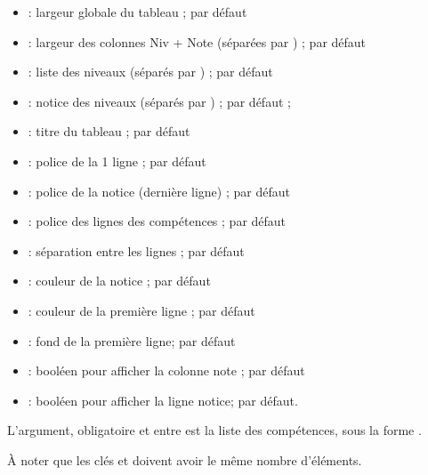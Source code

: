\documentclass[french,11pt,a4paper]{article}
\begin{document}
\begin{itemize}
	\item {} : largeur globale du tableau ;  par défaut
	\item {} : largeur des colonnes Niv + Note (séparées par ) ;  par défaut
	\item {} : liste des niveaux (séparés par ) ;  par défaut
	\item {} : notice des niveaux (séparés par ) ;  par défaut ;
	\item {} : titre du tableau ;  par défaut
	\item {} : police de la 1 ligne ;  par défaut
	\item {} : police de la notice (dernière ligne) ;  par défaut
	\item {} : police des lignes des compétences ;  par défaut
	\item {} : séparation entre les lignes ; \MontreCode{2pt} par défaut
	\item {} : couleur de la notice ;  par défaut
	\item {} : couleur de la première ligne ;  par défaut
	\item {} : fond de la première ligne;  par défaut
	\item {} : booléen pour afficher la colonne note ;  par défaut
	\item {} : booléen pour afficher la ligne notice;  par défaut.
\end{itemize}

L'argument, obligatoire et entre  est la liste des compétences, sous la forme .

À noter que les clés  et  doivent avoir le même nombre d'éléments.
\end{document}
